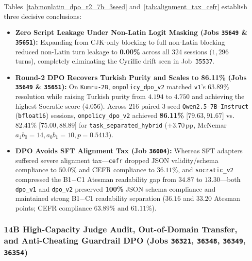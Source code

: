 \documentclass[a4paper,12pt]{report}
\begin{document}
Tables~\ref{tab:nonlatin_dpo_r2_7b_3seed} and~\ref{tab:alignment_tax_cefr} establish three decisive conclusions:
\begin{itemize}
    \item \textbf{Zero Script Leakage Under Non-Latin Logit Masking (Jobs \texttt{35649} \& \texttt{35651}):} Expanding from CJK-only blocking to full non-Latin blocking reduced non-Latin turn leakage to \textbf{0.00\%} across all $324$ sessions ($1{,}296$ turns), completely eliminating the Cyrillic drift seen in Job~\texttt{35537}.
    \item \textbf{Round-2 DPO Recovers Turkish Purity and Scales to 86.11\% (Jobs \texttt{35649} \& \texttt{35651}):} On \texttt{Kumru-2B}, \texttt{onpolicy\_dpo\_v2} matched \texttt{v1}'s $63.89\%$ resolution while raising Turkish purity from $4.194$ to $4.750$ and achieving the highest Socratic score ($4.056$). Across $216$ paired 3-seed \texttt{Qwen2.5-7B-Instruct} (\texttt{bfloat16}) sessions, \texttt{onpolicy\_dpo\_v2} achieved \textbf{86.11\%} [$79.63, 91.67$] vs.\ $82.41\%$ [$75.00, 88.89$] for \texttt{task\_separated\_hybrid} ($+3.70$\,pp, McNemar $a_1b_0=14, a_0b_1=10, p=0.5413$).
    \item \textbf{DPO Avoids SFT Alignment Tax (Job \texttt{36004}):} Whereas SFT adapters suffered severe alignment tax---\texttt{cefr} dropped JSON validity/schema compliance to $50.0\%$ and CEFR compliance to $36.11\%$, and \texttt{socratic\_v2} compressed the B1$-$C1 Atesman readability gap from $34.87$ to $13.30$---both \texttt{dpo\_v1} and \texttt{dpo\_v2} preserved \textbf{100\%} JSON schema compliance and maintained strong B1$-$C1 readability separation ($36.16$ and $33.20$ Atesman points; CEFR compliance $63.89\%$ and $61.11\%$).
\end{itemize}

\subsubsection{14B High-Capacity Judge Audit, Out-of-Domain Transfer, and Anti-Cheating Guardrail DPO (Jobs \texttt{36321}, \texttt{36348}, \texttt{36349}, \texttt{36354})}
\label{sec:14b_ood_guardrail}
\end{document}
